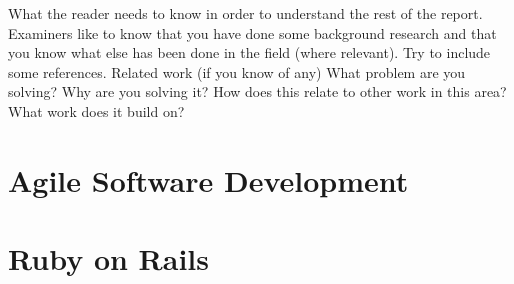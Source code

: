 
What the reader needs to know in order to understand the rest of the report. Examiners like to know that you have done some background research and that you know what else has been done in the field (where relevant). Try to include some references.
    Related work (if you know of any)
    What problem are you solving?
    Why are you solving it?
    How does this relate to other work in this area?
    What work does it build on?
    
\section{Agile Software Development}

\section{Ruby on Rails} 
